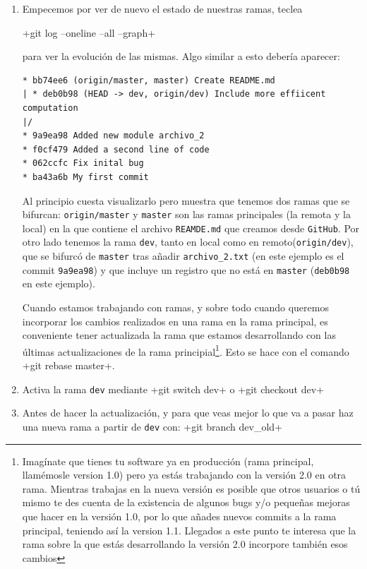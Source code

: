 \documentclass[a5paper,10pt]{article}
\begin{document}
    \begin{enumerate}
     \item Empecemos por ver de nuevo el estado de nuestras ramas, teclea
     
     \cverb+git log --oneline --all --graph+
     
     para ver la evolución de las mismas. Algo similar a esto debería aparecer:
     
     \begin{lstlisting}[style=custom]
* bb74ee6 (origin/master, master) Create README.md
| * deb0b98 (HEAD -> dev, origin/dev) Include more effiicent computation
|/  
* 9a9ea98 Added new module archivo_2
* f0cf479 Added a second line of code
* 062ccfc Fix inital bug
* ba43a6b My first commit
     \end{lstlisting}
    
    Al principio cuesta visualizarlo pero muestra que tenemos dos ramas que se bifurcan: \verb+origin/master+ y \verb+master+ son las ramas principales (la remota y la local) en la que contiene el archivo \verb+REAMDE.md+ que creamos desde \verb+GitHub+. Por otro lado tenemos la rama \verb+dev+, tanto en local como en remoto(\verb+origin/dev+), que se bifurcó de \verb+master+ tras añadir \verb+archivo_2.txt+ (en este ejemplo es el commit \verb+9a9ea98+) y que incluye un registro que no está en \verb+master+ (\verb+deb0b98+ en este ejemplo). 
    
    Cuando estamos trabajando con ramas, y sobre todo cuando queremos incorporar los cambios realizados en una rama en la rama principal, es conveniente tener actualizada la rama que estamos desarrollando con las últimas actualizaciones de la rama principial\footnote{Imagínate que tienes tu software ya en producción (rama principal, llamémosle version 1.0) pero ya estás trabajando con la versión 2.0 en otra rama. Mientras trabajas en la nueva versión es posible que otros usuarios o tú mismo te des cuenta de la existencia de algunos bugs y/o pequeñas mejoras que hacer en la versión 1.0, por lo que añades nuevos commits a la rama principal, teniendo así la version 1.1. Llegados a este punto te interesa que la rama sobre la que estás desarrollando la versión 2.0 incorpore también esos cambios}. Esto se hace con el comando \cverb+git rebase master+.
    
    \item Activa la rama \verb+dev+ mediante \cverb+git switch dev+ o \cverb+git checkout dev+
    
    \item Antes de hacer la actualización, y para que veas mejor lo que va a pasar haz una nueva rama a partir de \verb+dev+ con:
    \cverb+git branch dev_old+
    

\end{enumerate}
\end{document}
